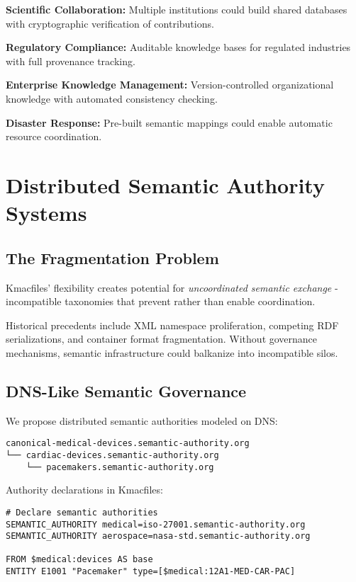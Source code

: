 \documentclass[conference]{IEEEtran}
\begin{document}
\textbf{Scientific Collaboration:} Multiple institutions could build shared databases with cryptographic verification of contributions.

\textbf{Regulatory Compliance:} Auditable knowledge bases for regulated industries with full provenance tracking.

\textbf{Enterprise Knowledge Management:} Version-controlled organizational knowledge with automated consistency checking.

\textbf{Disaster Response:} Pre-built semantic mappings could enable automatic resource coordination.

\section{Distributed Semantic Authority Systems}

\subsection{The Fragmentation Problem}

Kmacfiles' flexibility creates potential for \emph{uncoordinated semantic exchange} - incompatible taxonomies that prevent rather than enable coordination.

Historical precedents include XML namespace proliferation, competing RDF serializations, and container format fragmentation. Without governance mechanisms, semantic infrastructure could balkanize into incompatible silos.

\subsection{DNS-Like Semantic Governance}

We propose distributed semantic authorities modeled on DNS:

\begin{lstlisting}
canonical-medical-devices.semantic-authority.org
└── cardiac-devices.semantic-authority.org
    └── pacemakers.semantic-authority.org
\end{lstlisting}

Authority declarations in Kmacfiles:

\begin{lstlisting}[caption=Semantic Authority Declaration]
# Declare semantic authorities
SEMANTIC_AUTHORITY medical=iso-27001.semantic-authority.org
SEMANTIC_AUTHORITY aerospace=nasa-std.semantic-authority.org  

FROM $medical:devices AS base
ENTITY E1001 "Pacemaker" type=[$medical:12A1-MED-CAR-PAC]
\end{lstlisting}
\end{document}
